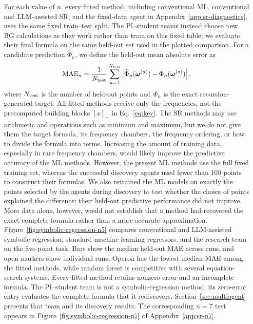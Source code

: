 \documentclass{article}
\begin{document}
For each value of $n$, every fitted method, including conventional ML,
conventional and LLM-assisted SR, and the fixed-data agent in
Appendix~\ref{app:sr-diagnostics}, uses the same fixed train--test split. The
PI--student teams instead choose new BG calculations as they work rather than
train on this fixed table; we evaluate their final formula on the
same held-out set used in the plotted comparison. For a candidate prediction
$\widehat\Phi_n$, we define the held-out
mean absolute error as
\begin{equation}
\mathrm{MAE}_n
=\frac{1}{N_{\rm test}}\sum_{a=1}^{N_{\rm test}}
\left|\widehat\Phi_n(\boldsymbol\omega^{(a)})
-\Phi_n(\boldsymbol\omega^{(a)})\right|,
\label{eq:mae}
\end{equation}
where $N_{\rm test}$ is the number of held-out points and $\Phi_n$ is the exact
recursion-generated target. All fitted methods receive only the frequencies,
not the precomputed building blocks
$[x]_+$ in Eq.~\eqref{eq:key}. The SR methods may use arithmetic and
operations such as minimum and maximum, but we do not give them the
target formula, its frequency chambers, the frequency ordering, or how to divide
the formula into terms. Increasing the amount of training data, especially in
rare frequency chambers, would likely improve the predictive accuracy of the
ML methods. However, the present ML methods use the full fixed training set,
whereas the successful discovery agents used fewer than 100 points to
construct their formulas. We also retrained the ML models on exactly the points
selected by the agents during discovery to test whether the choice of points
explained the difference; their
held-out predictive performance did not improve. More data alone, however, would not establish that a method had
recovered the exact complete formula rather than a more accurate approximation.
Figure~\ref{fig:symbolic-regression-n5} compares conventional and LLM-assisted
symbolic regression, standard machine-learning regressors, and the research
team on the five-point task. Bars show the median held-out MAE across runs,
and open markers show individual runs. Operon has the lowest median MAE among
the fitted methods, while random forest is competitive with several
equation-search systems. Every fitted method retains nonzero error and an
incomplete formula. The PI--student team is not a symbolic-regression method;
its zero-error entry evaluates the complete formula that it rediscovers.
Section~\ref{sec:multiagent} presents that team and its discovery results.
The corresponding $n=7$ test appears in
Figure~\ref{fig:symbolic-regression-n7} of Appendix~\ref{app:sr-n7}.
\end{document}
